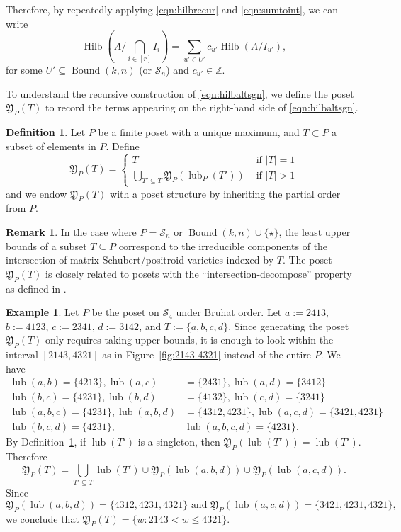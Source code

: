 \documentclass[12pt,reqno]{amsart}
\theoremstyle{definition}
\newtheorem{definition}[lemma]{Definition}
\newtheorem{example}[lemma]{Example}
\newtheorem{remark}[lemma]{Remark}
\newcommand{\symm}{\mathcal{S}}
\newcommand{\bound}{\operatorname{Bound}}
\newcommand{\lub}{\operatorname{lub}}
\newcommand{\hilb}{\operatorname{Hilb}}
\newcommand{\genP}{\mathfrak{Y}}
\begin{document}
{Therefore, by repeatedly applying \eqref{eqn:hilbrecur} and \eqref{eqn:sumtoint}, we can write 
\begin{equation}\label{eqn:hilbaltsgn}
    \hilb(A/\bigcap_{i\in [r]}I_i) = \sum_{u'\in U'}c_{u'}\hilb(A/I_{u'}),
\end{equation}
for some $U'\subseteq \bound(k,n)$ (or $\symm_n$) and $c_{u'}\in \mathbb{Z}$.

To understand the recursive construction of \eqref{eqn:hilbaltsgn}, we define the poset $\genP_{P}(T)$ to record the terms appearing on the right-hand side of \eqref{eqn:hilbaltsgn}. 
\begin{definition}
    \label{def:lub-poset}
    Let $P$ be a finite poset with a unique maximum, and $T\subset P$ a subset of elements in $P$. Define 
    \[\genP_P(T)=\begin{cases}
        T & \text{ if } |T| = 1 \\
        \bigcup_{T'\subseteq T}\genP_P(\lub_P(T')) & \text{ if } |T|>1
    \end{cases}
    \]
and we endow $\genP_{P}(T)$ with a poset structure by inheriting the partial order from $P$.
\end{definition}

\begin{remark}
     In the case where $P = \mathcal{S}_n$ or $\bound(k,n)\cup \{\star\}$, the least upper bounds of a subset $T\subseteq P$ correspond to the irreducible components of the intersection of matrix Schubert/positroid varieties indexed by $T$. The poset $\genP_{P}(T)$ is closely related to posets with the ``intersection-decompose'' property as defined in \cite{K09mobius}.
\end{remark}


\begin{example} Let $P$ be the poset on $\mathcal{S}_4$ under Bruhat order. Let $a:=2413$, $b:=4123$, $c:=2341$, $d:=3142$, and $T:=\{a,b,c,d\}$. Since generating the poset $\genP_{P}(T)$ only requires taking upper bounds, it is enough to look within the interval $[2143,4321]$ as in Figure~\ref{fig:2143-4321} instead of the entire $P$. We have
\begin{align*}
    \lub(a,b) = \{4213\}, \lub(a,c) &= \{2431\},\lub(a,d) = \{3412\}\\
    \lub(b,c) = \{4231\},\lub(b,d) &= \{4132\},\lub(c,d) = \{3241\}\\
    \lub(a,b,c) = \{4231\}, \lub(a,b,d) &= \{4312,4231\}, \lub(a,c,d) = \{3421,4231\}\\
    \lub(b,c,d) = \{4231\}, &\lub(a,b,c,d) = \{4231\}.
\end{align*}
By Definition~\ref{def:lub-poset}, if $\lub(T')$ is a singleton, then $\genP_{P}(\lub(T')) = \lub(T')$. Therefore
\[\genP_{P}(T) = \bigcup_{T'\subseteq T} \lub(T')\cup \genP_{P}(\lub(a,b,d))\cup\genP_{P}(\lub(a,c,d)).\]
Since 
\[\genP_{P}(\lub(a,b,d)) = \{4312,4231,4321\}\text{ and }\genP_{P}(\lub(a,c,d)) = \{3421,4231,4321\},\]
we conclude that $\genP_{P}(T) = \{w : 2143<w\leq 4321\}$.





\end{example}}
\end{document}
